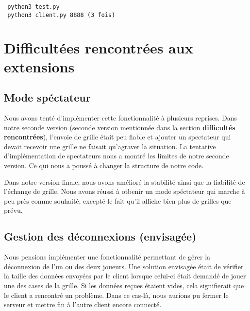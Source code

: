 \documentclass[11pt]{report}
\begin{document}
 \begin{verbatim}
 python3 test.py
 python3 client.py 8888 (3 fois)
 \end{verbatim}



\newpage

\section{Difficultées rencontrées aux extensions}

\subsection*{Mode spéctateur}

Nous avons tenté d'implémenter cette fonctionnalité à plusieurs reprises.
Dans notre seconde version (seconde version mentionnée dans
la section \textbf{difficultés rencontrées}), l'envoie de grille était
peu fiable et ajouter un spectateur qui devait recevoir une grille
ne faisait qu'agraver la situation.
La tentative d'implémentation de spectateurs nous a montré les limites de notre
seconde version. Ce qui nous a poussé à changer la structure de notre code.

\par

Dans notre version finale, nous avons amélioré la stabilité ainsi que la
fiabilité de l'échange de grille. Nous avons réussi à otbenir un mode
spéctateur qui marche à peu près comme souhaité, excepté le fait qu'il affiche bien
plus de grilles que prévu.

\subsection*{Gestion des déconnexions (envisagée)}

Nous pensions implémenter une fonctionnalité permettant de gérer la déconnexion
de l'un ou des deux joueurs. Une solution envisagée était de vérifier la taille
des données envoyées par le client lorsque celui-ci était demandé de jouer une
des cases de la grille. Si les données reçues étaient vides, cela signifierait
que le client a rencontré un problème. Dans ce cas-là, nous aurions pu fermer
le serveur et mettre fin à l'autre client encore connecté.
\end{document}

